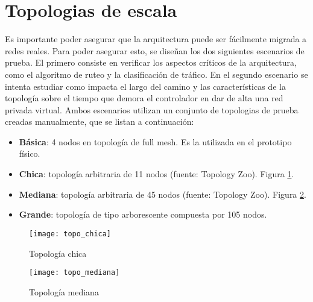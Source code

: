 \section{Topologias de escala}
Es importante poder asegurar que la arquitectura puede ser fácilmente migrada a redes reales. Para poder asegurar esto, se diseñan los dos siguientes escenarios de prueba. El primero consiste en verificar los aspectos críticos de la arquitectura, como el algoritmo de ruteo y la clasificación de tráfico. En el segundo escenario se intenta estudiar como impacta el largo del camino y las características de la topología sobre el tiempo que demora el controlador en dar de alta una red privada virtual. Ambos escenarios utilizan un conjunto de topologias de prueba creadas manualmente, que se listan a continuación:
\begin{itemize}
	\item \textbf{Básica}: 4 nodos en topología de full mesh. Es la utilizada en el prototipo físico.
	\item \textbf{Chica}: topología arbitraria de 11 nodos (fuente: Topology Zoo). Figura \ref{fig:topo_chica}.
	\item \textbf{Mediana}: topología arbitraria de 45 nodos (fuente: Topology Zoo). Figura \ref{fig:topo_mediana}.
	\item \textbf{Grande}: topología de tipo arborescente compuesta por 105 nodos.
\end{itemize}

\begin{figure}[t]
	\caption{Topología chica}
	\texttt{[image: topo\_chica]}
	\centering
	\label{fig:topo_chica}
\end{figure}

\begin{figure}[t]
	\caption{Topología mediana}
	\texttt{[image: topo\_mediana]}
	\centering
	\label{fig:topo_mediana}
\end{figure}

